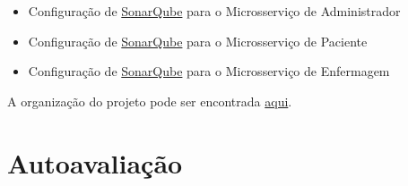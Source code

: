 \begin{apendicesenv}
\begin{itemize}
    \item Configuração de \href{https://github.com/PillWatcher/pillwatcher-dpb-admin-service/blob/master/sonar-project.properties}{SonarQube} para o Microsserviço de Administrador
    \item Configuração de \href{https://github.com/PillWatcher/pillwatcher-dpb-patient-service/blob/master/sonar-project.properties}{SonarQube} para o Microsserviço de Paciente
    \item Configuração de \href{https://github.com/PillWatcher/pillwatcher-dpb-nursing-service/blob/master/sonar-project.properties}{SonarQube} para o Microsserviço de Enfermagem
    
\end{itemize}

A organização do projeto pode ser encontrada \href{https://github.com/PillWatcher}{aqui}.



\chapter{Autoavaliação}


\end{apendicesenv}
